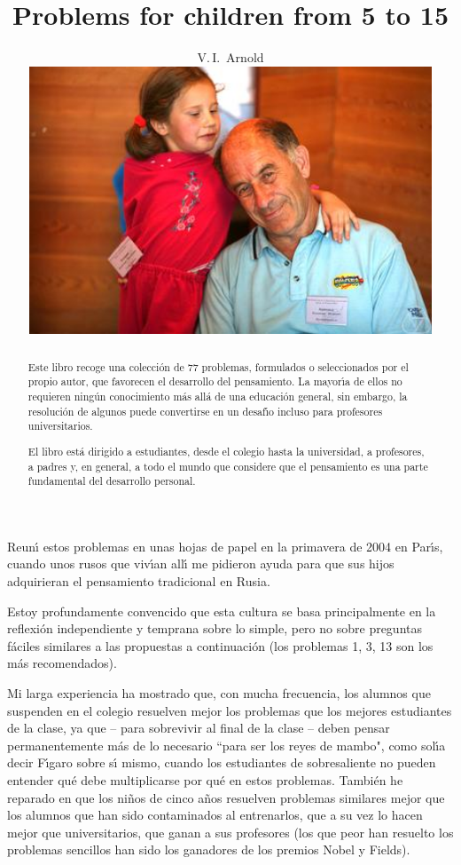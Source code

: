 \documentclass[12pt, spanish]{article}  %
\title{Problems for children from 5 to 15}
\author{V.\,I.~Arnold
\vspace*{2cm}\\ 
\includegraphics[width=12cm]{photo-arnold_small}
}
\date{}
\begin{document}
\def\eps{\varepsilon}
\maketitle
\thispagestyle{empty}

\newpage 
\setcounter{page}{1}
\begin{abstract}

Este libro recoge una colecci\'on de 77 problemas, formulados o seleccionados por el propio autor, 
que favorecen el desarrollo del pensamiento.
La mayor\'{\i}a de ellos no requieren ning\'un conocimiento m\'as all\'a de una educaci\'on general, 
sin embargo, la resoluci\'on de algunos puede convertirse en un desaf\'{\i}o incluso para profesores 
universitarios.

El libro est\'a dirigido a estudiantes, desde el colegio hasta la universidad, a profesores, 
a padres y, en general, a todo el mundo que considere que el pensamiento es una parte fundamental del desarrollo personal.
\end{abstract}

\newpage


Reun\'{\i} estos problemas en unas hojas de papel en la primavera de 2004 en Par\'{\i}s, cuando unos rusos 
que viv\'{\i}an all\'{\i} me pidieron ayuda para que sus hijos adquirieran el pensamiento tradicional en Rusia.

Estoy profundamente convencido que esta cultura se basa principalmente en la reflexi\'on independiente y
temprana sobre lo simple, pero no sobre preguntas f\'aciles similares a las propuestas a continuaci\'on 
(los problemas 1, 3, 13 son los m\'as recomendados).

Mi larga experiencia ha mostrado que, con mucha frecuencia, los alumnos que suspenden en el colegio 
resuelven mejor los problemas que los mejores estudiantes de la clase, ya que -- para sobrevivir al final
 de la clase -- deben pensar permanentemente m\'as de lo necesario ``para ser los reyes de mambo", 
 como sol\'{\i}a decir F\'{\i}garo sobre s\'{\i} mismo,
cuando los estudiantes de sobresaliente no pueden entender qu\'e debe multiplicarse por qu\'e en estos problemas.
Tambi\'en he reparado en que los ni\~nos de cinco a\~nos resuelven problemas similares mejor 
que los alumnos que han sido contaminados al entrenarlos, que a su vez lo hacen mejor que universitarios, 
que ganan a sus profesores (los que peor han resuelto los problemas sencillos han sido los ganadores de los premios 
Nobel y Fields).   

\ 
\end{document}
